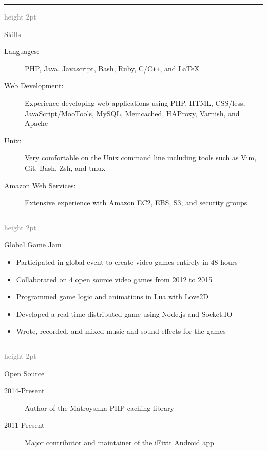 \documentclass[letterpaper,11pt]{article}
\newcommand{\ressectiondivider}{
   \vspace{5pt}
   \textcolor{gray}{\hrule height 2pt}
   \vspace{2.5pt}
}
\newcommand{\resitem}[1]{\item #1 \vspace{-2pt}}
\newenvironment{ressection}[1]{
   \ressectiondivider
   \begin{minipage}[t]{2.5cm}
      \flushleft
      {\Large #1}
   \end{minipage}
   \hfill
   \begin{minipage}[t]{16cm}
      \flushleft
}{
   \end{minipage}
}
\begin{document}
\begin{ressection}{Skills}
   \begin{description}
      \item[Languages:]
      PHP, Java, Javascript, Bash, Ruby, C/C{}\verb!++!, and \LaTeX
      \item[Web Development:]
      Experience developing web applications using PHP, HTML, CSS/less, JavaScript/MooTools, MySQL, Memcached, HAProxy, Varnish, and Apache
      \item[Unix:]
      Very comfortable on the Unix command line including tools such as Vim, Git, Bash, Zsh, and tmux
      \item[Amazon Web Services:]
      Extensive experience with Amazon EC2, EBS, S3, and security groups
   \end{description}
\end{ressection}

\begin{ressection}{Global Game Jam}
   \begin{itemize}
      \resitem{Participated in global event to create video games entirely in 48 hours}
      \resitem{Collaborated on 4 open source video games from 2012 to 2015}
      \resitem{Programmed game logic and animations in Lua with Love2D}
      \resitem{Developed a real time distributed game using Node.js and Socket.IO}
      \resitem{Wrote, recorded, and mixed music and sound effects for the games}
   \end{itemize}
\end{ressection}

\begin{ressection}{Open Source}
   \begin{description}
      \item[2014-Present] Author of the Matroyshka PHP caching library
      \item[2011-Present] Major contributor and maintainer of the iFixit Android app
   \end{description}
\end{ressection}
\end{document}
